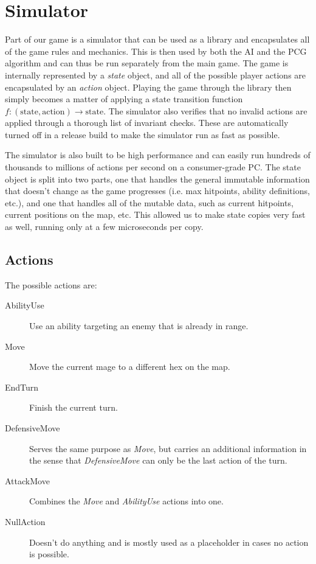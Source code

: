 
\section{Simulator}

Part of our game is a simulator that can be used as a library and encapsulates
all of the game rules and mechanics. This is then used by both the AI and the
PCG algorithm and can thus be run separately from the main game. The game is
internally represented by a \emph{state} object, and all of the possible player
actions are encapsulated by an \emph{action} object.  Playing the game through
the library then simply becomes a matter of applying a state transition
function $f: (\text{state}, \text{action}) \rightarrow \text{state}$. The
simulator also verifies that no invalid actions are applied through a thorough
list of invariant checks. These are automatically turned off in a release build
to make the simulator run as fast as possible.

The simulator is also built to be high performance and can easily run hundreds
of thousands to millions of actions per second on a consumer-grade PC. 
The state object is split into two parts, one that handles the
general immutable information that doesn't change as the game progresses (i.e.
max hitpoints, ability definitions, etc.), and one that handles all of the
mutable data, such as current hitpoints, current positions on the map, etc.
This allowed us to make state copies very fast as well, running only at a few
microseconds per copy.


\subsection{Actions}
The possible actions are:

\begin{description}
\item [AbilityUse] Use an ability targeting an enemy that is already in range.
\item [Move] Move the current mage to a different hex on the map.
\item [EndTurn] Finish the current turn.
\item [DefensiveMove] Serves the same purpose as \emph{Move}, but carries an
additional information in the sense that \emph{DefensiveMove} can only be
the last action of the turn.
\item [AttackMove] Combines the \emph{Move} and \emph{AbilityUse} actions into one.
\item [NullAction] Doesn't do anything and is mostly used as a placeholder in cases no action is possible.
\end{description}
